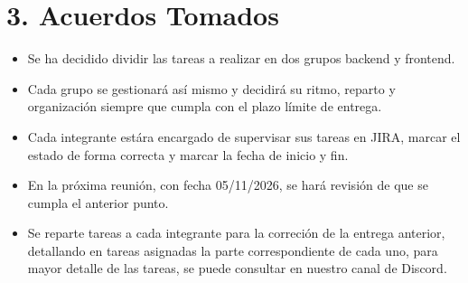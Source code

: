 \section*{3. Acuerdos Tomados}
\begin{itemize}
    \item Se ha decidido dividir las tareas a realizar en dos grupos backend y frontend.
    \item Cada grupo se gestionará así mismo y decidirá su ritmo, reparto y organización siempre que cumpla con el plazo límite de entrega.
    \item Cada integrante estára encargado de supervisar sus tareas en JIRA, marcar el estado de forma correcta y marcar la fecha de inicio y fin.
    \item En la próxima reunión, con fecha 05/11/2026, se hará revisión de que se cumpla el anterior punto.
    \item Se reparte tareas a cada integrante para la correción de la entrega anterior, detallando en tareas asignadas la parte correspondiente de cada uno, para mayor detalle de las tareas, se puede consultar en nuestro canal de Discord.

\end{itemize}

